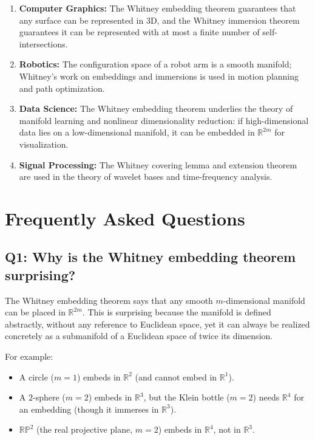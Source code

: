 \begin{enumerate}
    \item \textbf{Computer Graphics:} The Whitney embedding theorem guarantees that any surface can be represented in 3D, and the Whitney immersion theorem guarantees it can be represented with at most a finite number of self-intersections.
    \item \textbf{Robotics:} The configuration space of a robot arm is a smooth manifold; Whitney's work on embeddings and immersions is used in motion planning and path optimization.
    \item \textbf{Data Science:} The Whitney embedding theorem underlies the theory of manifold learning and nonlinear dimensionality reduction: if high-dimensional data lies on a low-dimensional manifold, it can be embedded in $\mathbb{R}^{2m}$ for visualization.
    \item \textbf{Signal Processing:} The Whitney covering lemma and extension theorem are used in the theory of wavelet bases and time-frequency analysis.
\end{enumerate}

\section{Frequently Asked Questions}

\subsection*{Q1: Why is the Whitney embedding theorem surprising?}

The Whitney embedding theorem says that any smooth $m$-dimensional manifold can be placed in $\mathbb{R}^{2m}$. This is surprising because the manifold is defined abstractly, without any reference to Euclidean space, yet it can always be realized concretely as a submanifold of a Euclidean space of twice its dimension.

For example:
\begin{itemize}
    \item A circle ($m=1$) embeds in $\mathbb{R}^2$ (and cannot embed in $\mathbb{R}^1$).
    \item A $2$-sphere ($m=2$) embeds in $\mathbb{R}^3$, but the Klein bottle ($m=2$) needs $\mathbb{R}^4$ for an embedding (though it immerses in $\mathbb{R}^3$).
    \item $\mathbb{RP}^2$ (the real projective plane, $m=2$) embeds in $\mathbb{R}^4$, not in $\mathbb{R}^3$.
\end{itemize}

